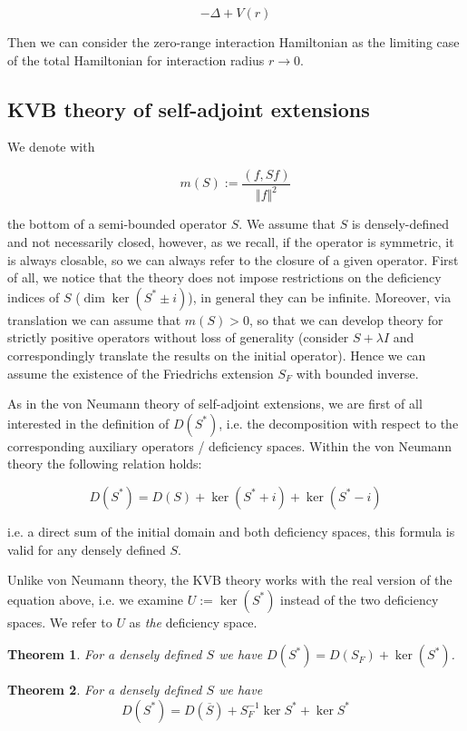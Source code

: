 \documentclass[11pt, a4paper, german]{article}
\theoremstyle{plain}
\newtheorem{theorem}{Theorem}
\theoremstyle{definition}
\theoremstyle{remark}
\numberwithin{equation}{section}
\numberwithin{theorem}{section}
\begin{document}
\begin{equation}
-\Delta + V(r)
\end{equation}

Then we can consider the zero-range interaction Hamiltonian as the limiting case of the total Hamiltonian for interaction radius $r \rightarrow 0$.

\subsection{KVB theory of self-adjoint extensions}

We denote with

$$m(S) := \frac{(f, Sf)}{\Vert f \Vert ^2}$$ 

the bottom of a semi-bounded operator $S$. We assume that $S$ is densely-defined and not necessarily closed, however, as we recall, if the operator is symmetric, it is always closable, so we can always refer to the closure of a given operator. First of all, we notice that the theory does not impose restrictions on the deficiency indices of $S$ ($\dim \ker (S^* \pm i)$), in general they can be infinite. Moreover, via translation we can assume that $m(S) > 0$, so that we can develop theory for strictly positive operators without loss of generality (consider $S + \lambda I$ and correspondingly translate the results on the initial operator). Hence we can assume the existence of the Friedrichs extension $S_F$ with bounded inverse.

As in the von Neumann theory of self-adjoint extensions, we are first of all interested in the definition of $D(S^*)$, i.e. the decomposition with respect to the corresponding auxiliary operators / deficiency spaces. Within the von Neumann theory the following relation holds:

$$D(S^*) = D(S) + \ker(S^*+i) + \ker(S^*-i)$$

i.e. a direct sum of the initial domain and both deficiency spaces, this formula is valid for any densely defined $S$.

Unlike von Neumann theory, the KVB theory works with the real version of the equation above, i.e. we examine $U := \ker(S^*)$ instead of the two deficiency spaces. We refer to $U$ as \textit{the} deficiency space.

\begin{theorem}
For a densely defined $S$ we have $D(S^*) = D(S_F) + \ker(S^*)$.
\end{theorem}

\begin{theorem}
For a densely defined $S$ we have 
\begin{equation}
D(S^*) = D(\overline{S}) + S_F^{-1} \ker S^* + \ker S^*
\end{equation}
\end{theorem}
\end{document}
